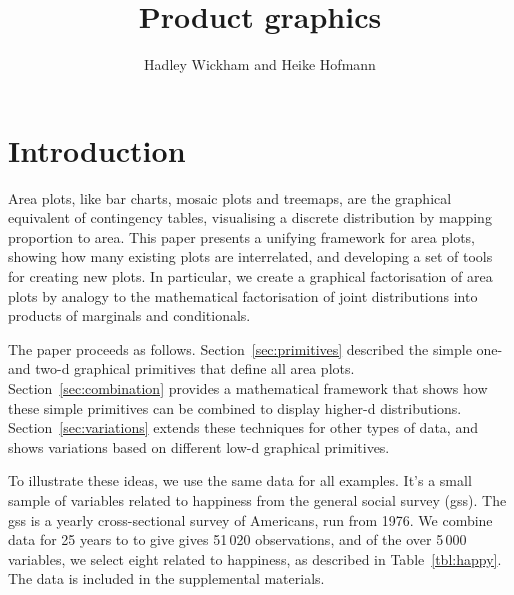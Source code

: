 \documentclass[letterpaper,oneside]{scrartcl}
\title{Product graphics}
\author{Hadley Wickham and Heike Hofmann}
\begin{document}
\maketitle

\section{Introduction}


%
%

Area plots, like bar charts, mosaic plots and treemaps, are the graphical equivalent of contingency tables, visualising a discrete distribution by mapping proportion to area. This paper presents a unifying framework for area plots, showing how many existing plots are interrelated, and developing a set of tools for creating new plots. In particular, we create a graphical factorisation of area plots by analogy to the mathematical factorisation of joint distributions into products of marginals and conditionals.

The paper proceeds as follows. Section~\ref{sec:primitives} described the simple one- and two-d graphical primitives that define all area plots. Section~\ref{sec:combination} provides a mathematical framework that shows how these simple primitives can be combined to display higher-d distributions. Section~\ref{sec:variations} extends these techniques for other types of data, and shows variations based on different low-d graphical primitives.

To illustrate these ideas, we use the same data for all examples. It's a small sample of variables related to happiness from the general social survey ({\sc gss}). The {\sc gss} is a yearly cross-sectional survey of Americans, run from 1976. We combine data for 25 years to to give gives 51\,020 observations, and of the over 5\,000 variables, we select eight related to happiness, as described in Table~\ref{tbl:happy}. The data is included in the supplemental materials.
\end{document}
